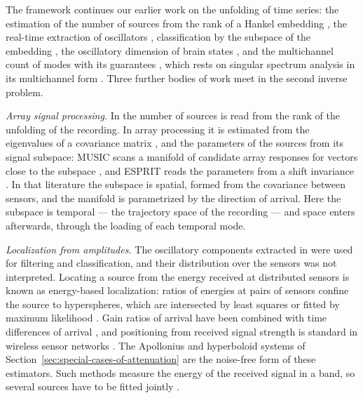 \documentclass{article}
\begin{document}
The framework continues our earlier work on the unfolding of time series: the estimation of the number of sources from the rank of a Hankel embedding \cite{ref-BernadotteBuchstaber, ref-Bernadotte05}, the real-time extraction of oscillators \cite{ref-Bernadotte06}, classification by the subspace of the embedding \cite{ref-Bernadotte10}, the oscillatory dimension of brain states \cite{ref-Bernadotte07}, and the multichannel count of modes with its guarantees \cite{ref-companionA}, which rests on singular spectrum analysis \cite{ref-Broomhead, ref-Vautard, ref-Golyandina01, ref-Golyandina02} in its multichannel form \cite{ref-Golyandina03, ref-Plaut}. Three further bodies of work meet in the second inverse problem.

\emph{Array signal processing.} In \cite{ref-BernadotteBuchstaber, ref-Bernadotte05} the number of sources is read from the rank of the unfolding of the recording. In array processing it is estimated from the eigenvalues of a covariance matrix \cite{ref-Wax, ref-Kritchman}, and the parameters of the sources from its signal subspace: MUSIC scans a manifold of candidate array responses for vectors close to the subspace \cite{ref-Schmidt}, and ESPRIT reads the parameters from a shift invariance \cite{ref-Roy}. In that literature the subspace is spatial, formed from the covariance between sensors, and the manifold is parametrized by the direction of arrival. Here the subspace is temporal --- the trajectory space of the recording --- and space enters afterwards, through the loading of each temporal mode.

\emph{Localization from amplitudes.} The oscillatory components extracted in \cite{ref-Bernadotte06} were used for filtering and classification, and their distribution over the sensors was not interpreted. Locating a source from the energy received at distributed sensors is known as energy-based localization: ratios of energies at pairs of sensors confine the source to hyperspheres, which are intersected by least squares or fitted by maximum likelihood \cite{ref-Li, ref-Sheng, ref-Meng}. Gain ratios of arrival have been combined with time differences of arrival \cite{ref-Ho}, and positioning from received signal strength is standard in wireless sensor networks \cite{ref-Patwari}. The Apollonius and hyperboloid systems of Section~\ref{sec:special-cases-of-attenuation} are the noise-free form of these estimators. Such methods measure the energy of the received signal in a band, so several sources have to be fitted jointly \cite{ref-Sheng}.
\end{document}
